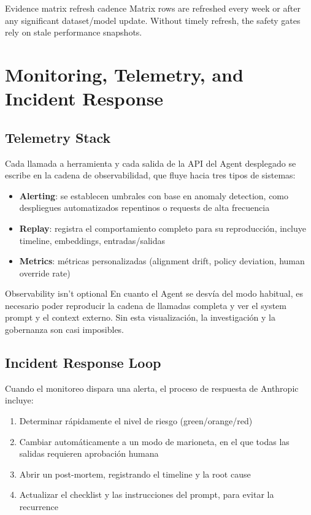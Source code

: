 \documentclass[a4paper]{article}
\begin{document}
\begin{warningbox}{Evidence matrix refresh cadence}
Matrix rows are refreshed every week or after any significant dataset/model update. Without timely refresh, the safety gates rely on stale performance snapshots.
\end{warningbox}
\section{Monitoring, Telemetry, and Incident Response}

\subsection{Telemetry Stack}

Cada llamada a herramienta y cada salida de la API del Agent desplegado se escribe en la cadena de observabilidad, que fluye hacia tres tipos de sistemas:

\begin{itemize}
    \item \textbf{Alerting}: se establecen umbrales con base en anomaly detection, como despliegues automatizados repentinos o requests de alta frecuencia
    \item \textbf{Replay}: registra el comportamiento completo para su reproducción, incluye timeline, embeddings, entradas/salidas
    \item \textbf{Metrics}: métricas personalizadas (alignment drift, policy deviation, human override rate)
\end{itemize}

\begin{warningbox}{Observability isn't optional}
En cuanto el Agent se desvía del modo habitual, es necesario poder reproducir la cadena de llamadas completa y ver el system prompt y el context externo. Sin esta visualización, la investigación y la gobernanza son casi imposibles.
\end{warningbox}

\subsection{Incident Response Loop}

Cuando el monitoreo dispara una alerta, el proceso de respuesta de Anthropic incluye:

\begin{enumerate}
    \item Determinar rápidamente el nivel de riesgo (green/orange/red)
    \item Cambiar automáticamente a un modo de marioneta, en el que todas las salidas requieren aprobación humana
    \item Abrir un post-mortem, registrando el timeline y la root cause
    \item Actualizar el checklist y las instrucciones del prompt, para evitar la recurrence
\end{enumerate}
\end{document}
